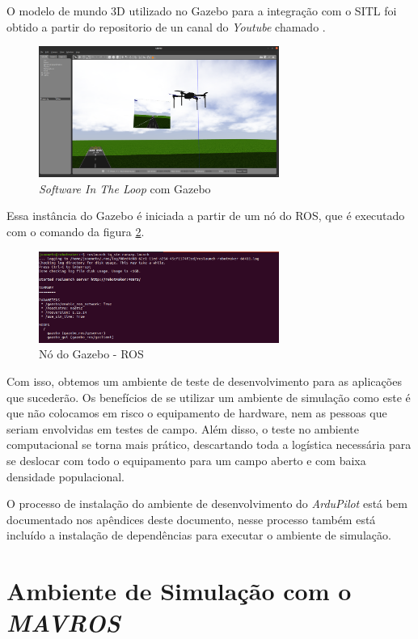 \documentclass[12pt,a4paper,oneside]{book}
\begin{document}
O modelo de mundo 3D utilizado no Gazebo para a integração com o SITL foi obtido a partir do repositorio de un canal do \textit{Youtube} chamado \cite{url:iq}. 
%
\begin{figure}[H]
  \centering
  \includegraphics[width=0.7\textwidth]{Images/Desenvolvimento/sitl_gazebo.png}
  \caption{\textit{Software In The Loop} com Gazebo}
  \label{fig:sitl_gazebo.png.0}
\end{figure}
%
Essa instância do Gazebo é iniciada a partir de um nó do ROS, que é executado com o comando da figura \ref{fig:ros_gazebo.png.0}.
%
\begin{figure}[H]
  \centering
  \includegraphics[width=0.7\textwidth]{Images/Desenvolvimento/ros_gazebo.png}
  \caption{Nó do Gazebo - ROS}
  \label{fig:ros_gazebo.png.0}
\end{figure}
%

Com isso, obtemos um ambiente de teste de desenvolvimento para as aplicações que sucederão. Os benefícios de se utilizar um ambiente de simulação como este é que não colocamos em risco o equipamento de hardware, nem as pessoas que seriam envolvidas em testes de campo. Além disso, o teste no ambiente computacional se torna mais prático, descartando toda a logística necessária para se deslocar com todo o equipamento para um campo aberto e com baixa densidade populacional.

O processo de instalação do ambiente de desenvolvimento do \textit{ArduPilot} está bem documentado nos apêndices deste documento, nesse processo também está incluído a instalação de dependências para executar o ambiente de simulação. 

\section{Ambiente de Simulação com o \textit{MAVROS}}
\end{document}
